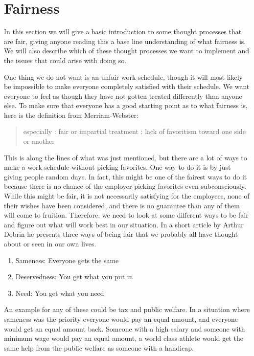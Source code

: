 \section{Fairness}
In this section we will give a basic introduction to some thought processes that are fair, giving anyone reading this a base line understanding of what fairness is. We will also describe which of these thought processes we want to implement and the issues that could arise with doing so.  

One thing we do not want is an unfair work schedule, though it will most likely be impossible to make everyone completely satisfied with their schedule. We want everyone to feel as though they have not gotten treated differently than anyone else. To make sure that everyone has a good starting point as to what fairness is, here is the definition from Merriam-Webster: 
\begin{quote}
    especially : fair or impartial treatment : lack of favoritism toward one side or another
    \parencite{merriam-webster_definition_nodate}
\end{quote}
This is along the lines of what was just mentioned, but there are a lot of ways to make a work schedule without picking favorites. One way to do it is by just giving people random days. In fact, this might be one of the fairest ways to do it because there is no chance of the employer picking favorites even subconsciously. While this might be fair, it is not necessarily satisfying for the employees, none of their wishes have been considered, and there is no guarantee than any of them will come to fruition. Therefore, we need to look at some different ways to be fair and figure out what will work best in our situation. In a short article by Arthur Dobrin \parencite{dobrin_its_2012} he presents three ways of being fair that we probably all have thought about or seen in our own lives. 
\begin{enumerate}
    \item Sameness: Everyone gets the same
    \item Deservedness: You get what you put in
    \item Need: You get what you need
\end{enumerate}
An example for any of these could be tax and public welfare. In a situation where sameness was the priority everyone would pay an equal amount, and everyone would get an equal amount back. Someone with a high salary and someone with minimum wage would pay an equal amount, a world class athlete would get the same help from the public welfare as someone with a handicap.
